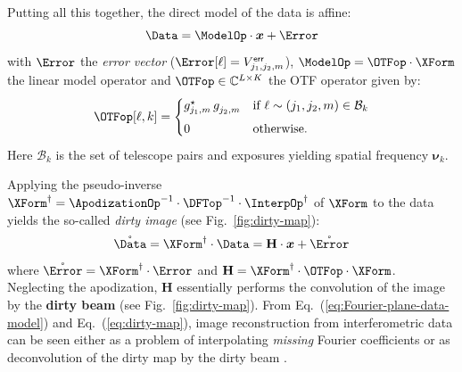 \documentclass{article}
\newcommand{\vocab}[1]{\textbf{#1}}
\newcommand{\Tag}[1]{\mathsf{#1}}        %
\newcommand{\V}[1]{\boldsymbol{#1}}      %
\newcommand{\M}[1]{\mathbf{#1}}          %
\newcommand{\T}{^\mathrm{T}}             %
\newcommand{\Complexes}{\mathbb{C}}
\newcommand{\Eq}[1]{Eq.~(\ref{#1})}
\newcommand{\Fig}[1]{Fig.~\ref{#1}}
\newcommand{\ComplexVis}{V}
\newcommand{\Freq}{\nu}               %
\newcommand{\VFreq}{\V{\Freq}}
\newcommand{\Param}{x}
\newcommand{\VParam}{\V{\Param}}
\newcommand{\Gain}{g}
\newcommand{\BaseSet}{\mathcal{B}}  %
\newcommand{\ErrorTag}{\Tag{err}}
\begin{document}
Putting all this together, the direct model of the data is affine:
\begin{equation}
  \label{eq:Fourier-plane-data-model}
  \Data = \ModelOp\cdot\VParam + \Error
\end{equation}
with $\Error$ the \emph{error vector}
($\Error[\ell]=\ComplexVis_{j_1,j_2,m}^\ErrorTag$), $\ModelOp =
\OTFop\cdot\XForm$ the linear model operator and 
$\OTFop\in\Complexes^{L\times{}K}$ the OTF operator given by:
\begin{equation}
  \label{eq:otf}
  \OTFop[\ell,k] = 
  \begin{cases}
     \Gain_{j_1,m}^{\star} \, \Gain_{j_2,m}^{}
     & \text{if } \ell\sim(j_1,j_2,m) \in \BaseSet_k\\[1ex]
     0 & \text{otherwise.}
  \end{cases}
\end{equation}
Here $\BaseSet_k$ is the set of telescope pairs and exposures yielding
spatial frequency $\VFreq_k$.

Applying the pseudo-inverse $\XForm^{\dagger} =
\ApodizationOp^{-1}\cdot\DFTop^{-1}\cdot\InterpOp^{\dagger}$ of $\XForm$ to the data
yields the so-called \emph{dirty image} (see \Fig{fig:dirty-map}):
\begin{equation}
  \label{eq:dirty-map}
  \mathring{\Data} = \XForm^{\dagger}\cdot\Data = \M{H}\cdot\VParam
  + \mathring{\Error}
\end{equation}
where $\mathring{\Error}=\XForm^{\dagger}\cdot\Error$ and
$\M{H}=\XForm^{\dagger}\cdot\OTFop\cdot\XForm$. Neglecting the apodization, $\M{H}$
essentially performs the convolution of the image by the \vocab{dirty beam}
(see \Fig{fig:dirty-map}).  From \Eq{eq:Fourier-plane-data-model} and
\Eq{eq:dirty-map}, image reconstruction from interferometric data can be seen
either as a problem of interpolating \emph{missing} Fourier coefficients or as
deconvolution of the dirty map by the dirty beam
\citep{Giovannelli_Coulais-2005-pos_mix}.
\end{document}
